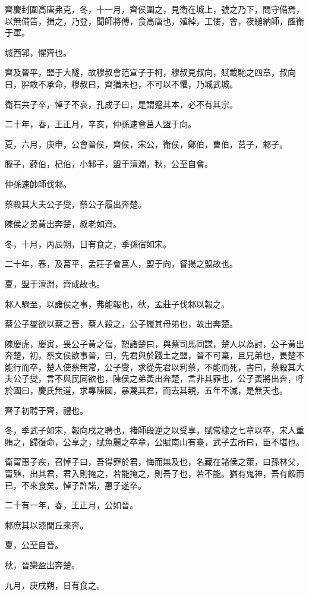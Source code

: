 \begin{pinyinscope}
齊慶封圍高唐弗克，冬，十一月，齊侯圍之，見衛在城上，號之乃下，問守備焉，以無備告，揖之，乃登，聞師將傅，食高唐也，殖綽，工僂，會，夜縋納師，醢衛于軍。

城西郛，懼齊也。

齊及晉平，盟于大隧，故穆叔會范宣子于柯，穆叔見叔向，賦載馳之四章，叔向曰，肸敢不承命，穆叔曰，齊猶未也，不可以不懼，乃城武城。

衛石共子卒，悼子不哀，孔成子曰，是謂蹙其本，必不有其宗。

二十年，春，王正月，辛亥，仲孫速會莒人盟于向。

夏，六月，庚申，公會晉侯，齊侯，宋公，衛侯，鄭伯，曹伯，莒子，邾子。

滕子，薛伯，杞伯，小邾子，盟于澶淵，秋，公至自會。

仲孫速帥師伐邾。

蔡殺其大夫公子燮，蔡公子履出奔楚。

陳侯之弟黃出奔楚，叔老如齊。

冬，十月，丙辰朔，日有食之，季孫宿如宋。

二十年，春，及莒平，孟莊子會莒人，盟于向，督揚之盟故也。

夏，盟于澶淵，齊成故也。

邾人驟至，以諸侯之事，弗能報也，秋，孟莊子伐邾以報之。

蔡公子燮欲以蔡之晉，蔡人殺之，公子履其母弟也，故出奔楚。

陳慶虎，慶寅，畏公子黃之偪，愬諸楚曰，與蔡司馬同謀，楚人以為討，公子黃出奔楚，初，蔡文侯欲事晉，曰，先君與於踐土之盟，晉不可棄，且兄弟也，畏楚不能行而卒，楚人使蔡無常，公子燮，求從先君以利蔡，不能而死，書曰，蔡殺其大夫公子燮，言不與民同欲也，陳侯之弟黃出奔楚，言非其罪也，公子黃將出奔，呼於國曰，慶氏無道，求專陳國，暴蔑其君，而去其親，五年不滅，是無天也。

齊子初聘于齊，禮也。

冬，季武子如宋，報向戌之聘也，褚師段逆之以受享，賦常棣之七章以卒，宋人重賄之，歸復命，公享之，賦魚麗之卒章，公賦南山有臺，武子去所曰，臣不堪也。

衛甯惠子疾，召悼子曰，吾得罪於君，悔而無及也，名藏在諸侯之策，曰孫林父，甯殖，出其君，君入則掩之，若能掩之，則吾子也，若不能。猶有鬼神，吾有餒而已，不來食矣。悼子許諾，惠子遂卒。

二十有一年，春，王正月，公如晉。

邾庶其以漆閭丘來奔。

夏，公至自晉。

秋，晉欒盈出奔楚。

九月，庚戌朔，日有食之。


\end{pinyinscope}
